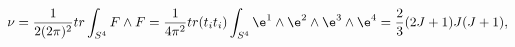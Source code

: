 \begin{equation}
\nu={1\over 2(2\pi)^2}tr\int_{S^4}F\wedge F={1\over 4\pi^2}tr(t_it_i)\int_{S^4}
\e^1\wedge\e^2\wedge\e^3\wedge\e^4 ={2\over 3}(2J+1)J(J+1),
\end{equation}

